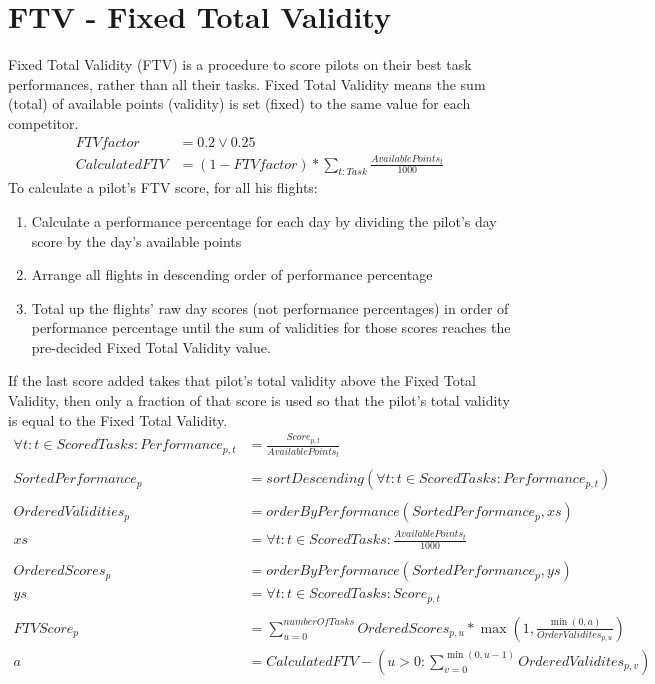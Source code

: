 \documentclass{article}
\begin{document}
\section{FTV - Fixed Total Validity}
\label{sec:fixed-total-validity}
Fixed Total Validity (FTV) is a procedure to score pilots on their best task
performances, rather than all their tasks. Fixed Total Validity means the sum
(total) of available points (validity) is set (fixed) to the same value for
each competitor.
\begin{align*}
    FTVfactor &= 0.2 \lor 0.25 \\
    CalculatedFTV &= (1 - FTVfactor) * \sum_{t : Task}\frac{AvailablePoints_t}{1000}
\end{align*}
To calculate a pilot’s FTV score, for all his flights:
\begin{enumerate}
    \item
        Calculate a performance percentage for each day by dividing the pilot's
        day score by the day’s available points
    \item
        Arrange all flights in descending order of performance percentage
    \item
        Total up the flights' raw day scores (not performance percentages) in
        order of performance percentage until the sum of validities for those
        scores reaches the pre-decided Fixed Total Validity value.
\end{enumerate}
If the last score added takes that pilot's total validity above the Fixed Total Validity, then only a fraction
of that score is used so that the pilot's total validity is equal to the Fixed Total Validity.
\begin{align*}
    \forall t : t \in ScoredTasks : Performance_{p, t} &= \frac{Score_{p, t}}{AvailablePoints_t} \\
    \\
    SortedPerformance_p &= sortDescending(\forall t : t \in ScoredTasks : Performance_{p, t}) \\
    \\
    OrderedValidities_p &= orderByPerformance(SortedPerformance_p, xs) \\
    xs &= \forall t : t \in ScoredTasks : \frac{AvailablePoints_t}{1000} \\
    \\
    OrderedScores_p &= orderByPerformance(SortedPerformance_p, ys) \\
    ys &= \forall t : t \in ScoredTasks : Score_{p, t} \\
    \\
    FTVScore_p &= \sum_{u = 0}^{numberOfTasks} OrderedScores_{p, u} * \max(1, \frac{\min(0, a)}{OrderValidites_{p, u}}) \\
    a &= CalculatedFTV - (u > 0 : \sum_{v = 0}^{\min(0, u - 1)} OrderedValidites_{p, v})
\end{align*}
\end{document}
